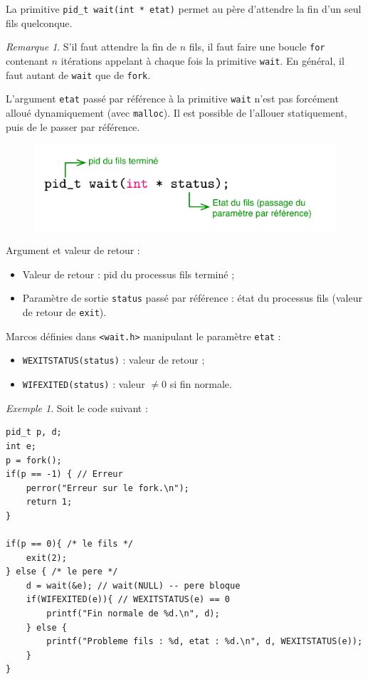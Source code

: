 \documentclass[11pt,english,french]{scrreprt}
\theoremstyle{remark}
\newtheorem*{rem*}{Remarque}
\newtheorem*{ex*}{Exemple}
\theoremstyle{definition}
\begin{document}
La primitive \lstinline!pid_t wait(int * etat)! permet au père d'attendre la fin d'un seul fils quelconque.

\begin{rem*}
	S'il faut attendre la fin de $n$ fils, il faut faire une boucle \lstinline!for! contenant $n$ itérations appelant à chaque fois la primitive \lstinline!wait!. En général, il faut autant de \lstinline!wait! que de \lstinline!fork!.
	
	L'argument \lstinline!etat! passé par référence à la primitive \lstinline!wait! n'est pas forcément alloué dynamiquement (avec \lstinline!malloc!). Il est possible de l'allouer statiquement, puis de le passer par référence.
\end{rem*}

\begin{figure}[h!]
	\center
	\vspace{-20pt}
	\includegraphics[scale=.75]{img/wait}
	\vspace{-10pt}
\end{figure}
Argument et valeur de retour :\begin{itemize}
	\item Valeur de retour : pid du processus fils terminé ;
	\item Paramètre de sortie \lstinline!status! passé par référence : état du processus fils (valeur de retour de \lstinline!exit!).
\end{itemize}

Marcos définies dans \lstinline!<wait.h>! manipulant le paramètre \lstinline!etat! :\begin{itemize}
	\item \lstinline!WEXITSTATUS(status)! : valeur de retour ;
	\item \lstinline!WIFEXITED(status)! : valeur $\neq 0$ si fin normale.
\end{itemize} 

\begin{ex*}
	Soit le code suivant :
\begin{lstlisting}
pid_t p, d;
int e;
p = fork();
if(p == -1) { // Erreur
	perror("Erreur sur le fork.\n");
	return 1;
}

if(p == 0){	/* le fils */
	exit(2);
} else { /* le pere */	
	d = wait(&e); // wait(NULL) -- pere bloque
	if(WIFEXITED(e)){ // WEXITSTATUS(e) == 0
		printf("Fin normale de %d.\n", d);
	} else {
		printf("Probleme fils : %d, etat : %d.\n", d, WEXITSTATUS(e));
	}
}
\end{lstlisting}
\end{ex*}
\end{document}
